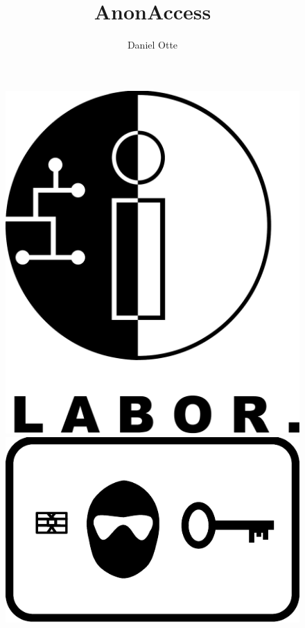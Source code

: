 \documentclass[10pt,a4paper]{article}
\author{Daniel Otte}
\title{AnonAccess}
\begin{document}
 
\maketitle

\begin{figure}
 \begin{minipage}[b]{.3\linewidth}
 \includegraphics[scale=0.1]{Labor} 
 \end{minipage}
 \hspace{0.5\linewidth}
 \begin{minipage}[b]{.3\linewidth}
 \includegraphics[scale=0.7]{AnonAccessLogo} 
 \end{minipage}
\end{figure}
\end{document}
